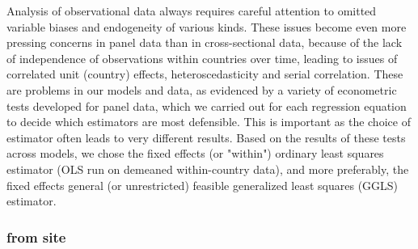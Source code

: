 \documentclass[12pt]{article}
\begin{document}
Analysis of observational data always requires careful attention to omitted variable biases and endogeneity of various kinds.
These issues become even more pressing concerns in panel data than in cross-sectional data, because of the lack of independence of observations within countries over time, leading to issues of correlated unit (country) effects, heteroscedasticity and serial correlation.
These are problems in our models and data, as evidenced by a variety of econometric tests developed for panel data, which we carried out for each regression equation to decide which estimators are most defensible.
This is important as the choice of estimator often leads to very different results.
Based on the results of these tests across models, we chose the fixed effects (or "within") ordinary least squares estimator (OLS run on demeaned within-country data), and more preferably, the fixed effects general (or unrestricted) feasible generalized least squares (GGLS) estimator.

\subsubsection{from site}
\end{document}
